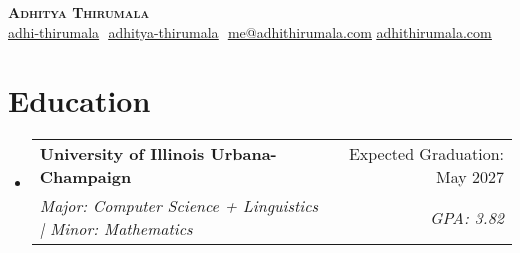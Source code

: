 \documentclass{article}
\makeatletter
\newcommand{\resumeSubheading}[4]{
  \vspace{-2pt}\item
    \begin{tabular*}{0.97\textwidth}[t]{l@{\extracolsep{\fill}}r}
      \textbf{#1} & #2 \\
      \textit{\small#3} & \textit{\small #4} \\
    \end{tabular*}\vspace{-7pt}
}
\newcommand{\resumeSubHeadingListStart}{\begin{itemize}[leftmargin=0.15in, label={}]}
\newcommand{\resumeSubHeadingListEnd}{\end{itemize}}
\makeatother
\begin{document}
\begin{flushright}
	\vspace{-4pt}
	\color{gray}
\end{flushright}

\vspace{-7pt}

\begin{center}
	\textbf{{\Huge\scshape Adhitya Thirumala}} \\ \vspace{8pt}
	\small
	\href{https://github.com/adhi-thirumala}{\underline{adhi-thirumala}} $  $
	\href{https://www.linkedin.com/in/adhitya-thirumala}
	{\underline{adhitya-thirumala}} $  $
	\href{mailto:me@adhithirumala.com}
	{\underline{me@adhithirumala.com}}
	\href{https://www.adhithirumala.com}
	{\underline{adhithirumala.com}} $  $
   $  $



\end{center}

\section{Education}
\resumeSubHeadingListStart

\resumeSubheading{University of Illinois Urbana-Champaign} {Expected Graduation: May 2027} {Major: Computer Science + Linguistics | Minor: Mathematics}{GPA: 3.82}

\resumeSubHeadingListEnd
\vspace{-7.5pt}


\end{document}
